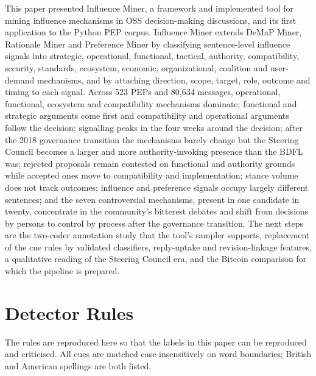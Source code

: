 \documentclass[sigconf,screen]{acmart}
\begin{document}
This paper presented Influence Miner, a framework and implemented tool for mining influence mechanisms in OSS decision-making discussions, and its first application to the Python PEP corpus. Influence Miner extends DeMaP Miner, Rationale Miner and Preference Miner by classifying sentence-level influence signals into strategic, operational, functional, tactical, authority, compatibility, security, standards, ecosystem, economic, organizational, coalition and user-demand mechanisms, and by attaching direction, scope, target, role, outcome and timing to each signal. Across 523 PEPs and 80,634 messages, operational, functional, ecosystem and compatibility mechanisms dominate; functional and strategic arguments come first and compatibility and operational arguments follow the decision; signalling peaks in the four weeks around the decision; after the 2018 governance transition the mechanisms barely change but the Steering Council becomes a larger and more authority-invoking presence than the BDFL was; rejected proposals remain contested on functional and authority grounds while accepted ones move to compatibility and implementation; stance volume does not track outcomes; influence and preference signals occupy largely different sentences; and the seven controversial mechanisms, present in one candidate in twenty, concentrate in the community's bitterest debates and shift from decisions by persons to control by process after the governance transition. The next steps are the two-coder annotation study that the tool's sampler supports, replacement of the cue rules by validated classifiers, reply-uptake and revision-linkage features, a qualitative reading of the Steering Council era, and the Bitcoin comparison for which the pipeline is prepared.

\appendix

\section{Detector Rules}
\label{app:rules}

The rules are reproduced here so that the labels in this paper can be reproduced and criticised. All cues are matched case-insensitively on word boundaries; British and American spellings are both listed.
\end{document}
